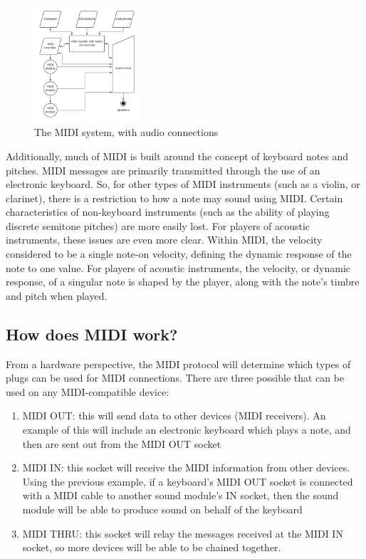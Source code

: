 \begin{figure}
	\centering
	\includegraphics[width=0.35\textwidth]{figures/midi-system-with-audio-connections.png}
	\caption{The MIDI system, with audio connections}
	\label{fig:midi-system-with-audio-connections}
\end{figure}

Additionally, much of MIDI is built around the concept of keyboard notes and pitches. MIDI messages are primarily transmitted through the use of an electronic keyboard. So, for other types of MIDI instruments (such as a violin, or clarinet), there is a restriction to how a note may sound using MIDI. Certain characteristics of non-keyboard instruments (such as the ability of playing discrete semitone pitches) are more easily lost. For players of acoustic instruments, these issues are even more clear. Within MIDI, the velocity considered to be a single note-on velocity, defining the dynamic response of the note to one value. For players of acoustic instruments, the velocity, or dynamic response, of a singular note is shaped by the player, along with the note's timbre and pitch when played\cite{Kirk_Hunt_2013}.

\subsection[How does MIDI work?]{How does MIDI work?}\label{section:how-midi}
From a hardware perspective, the MIDI protocol will determine which types of plugs can be used for MIDI connections. There are three possible  that can be used on any MIDI-compatible device:

\begin{enumerate}
	\item MIDI OUT: this will send data to other devices (MIDI receivers). An example of this will include an electronic keyboard which plays a note, and then  are sent out from the MIDI OUT socket
	\item MIDI IN: this socket will receive the MIDI information from other devices. Using the previous example, if a keyboard's MIDI OUT socket is connected with a MIDI cable to another sound module's IN socket, then the sound module will be able to produce sound on behalf of the keyboard
	\item MIDI THRU: this socket will relay the messages received at the MIDI IN socket, so more devices will be able to be chained together.
\end{enumerate}\label{enu:list-of-midi-sockets}

